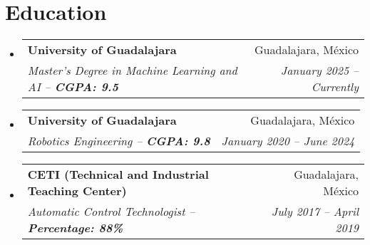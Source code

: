 \documentclass[a4paper,11pt]{article}
\makeatletter
\newcommand{\resumeSubheading}[4]{
  \vspace{-2pt}\item
    \begin{tabular*}{1\textwidth}[t]{l@{\extracolsep{\fill}}r}
      \textbf{#1} & #2 \\
      \textit{\small#3} & \textit{\small #4} \\
    \end{tabular*}\vspace{-8pt}
}
\newcommand{\resumeSubHeadingListStart}{\begin{itemize}[leftmargin=0in, label={}]}
\newcommand{\resumeSubHeadingListEnd}{\end{itemize}}
\makeatother
\begin{document}
\section{\Large{Education}}
  \resumeSubHeadingListStart
    \resumeSubheading
      {University of Guadalajara}{Guadalajara, México}
      {Master's Degree in Machine Learning and AI -- \textbf{CGPA: 9.5}}{January 2025 -- Currently}
    \resumeSubheading
      {University of Guadalajara}{Guadalajara, México}
      {Robotics Engineering -- \textbf{CGPA: 9.8}}{January 2020 -- June 2024}
    \resumeSubheading
      {CETI (Technical and Industrial Teaching Center)}{Guadalajara, México}
      {Automatic Control Technologist -- \textbf{Percentage: 88\%}}{July 2017 -- April 2019}
  \resumeSubHeadingListEnd
\vspace{-11pt}

\end{document}
